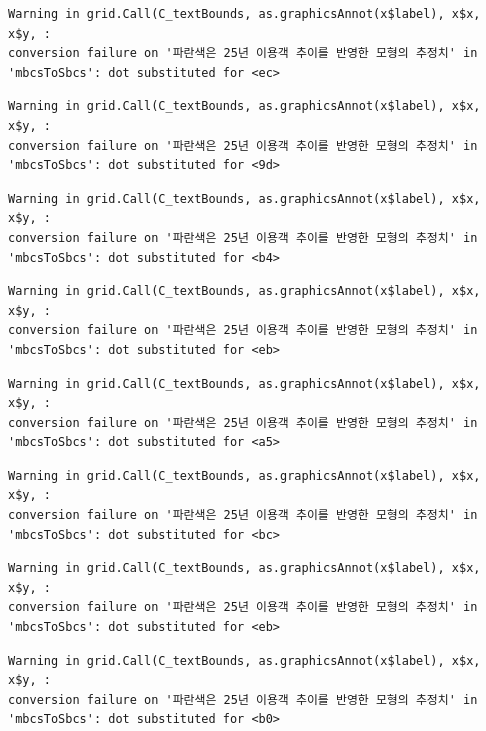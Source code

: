 \documentclass[
  letterpaper,
  DIV=11,
  numbers=noendperiod]{scrreprt}
\begin{document}
\begin{verbatim}
Warning in grid.Call(C_textBounds, as.graphicsAnnot(x$label), x$x, x$y, :
conversion failure on '파란색은 25년 이용객 추이를 반영한 모형의 추정치' in
'mbcsToSbcs': dot substituted for <ec>
\end{verbatim}

\begin{verbatim}
Warning in grid.Call(C_textBounds, as.graphicsAnnot(x$label), x$x, x$y, :
conversion failure on '파란색은 25년 이용객 추이를 반영한 모형의 추정치' in
'mbcsToSbcs': dot substituted for <9d>
\end{verbatim}

\begin{verbatim}
Warning in grid.Call(C_textBounds, as.graphicsAnnot(x$label), x$x, x$y, :
conversion failure on '파란색은 25년 이용객 추이를 반영한 모형의 추정치' in
'mbcsToSbcs': dot substituted for <b4>
\end{verbatim}

\begin{verbatim}
Warning in grid.Call(C_textBounds, as.graphicsAnnot(x$label), x$x, x$y, :
conversion failure on '파란색은 25년 이용객 추이를 반영한 모형의 추정치' in
'mbcsToSbcs': dot substituted for <eb>
\end{verbatim}

\begin{verbatim}
Warning in grid.Call(C_textBounds, as.graphicsAnnot(x$label), x$x, x$y, :
conversion failure on '파란색은 25년 이용객 추이를 반영한 모형의 추정치' in
'mbcsToSbcs': dot substituted for <a5>
\end{verbatim}

\begin{verbatim}
Warning in grid.Call(C_textBounds, as.graphicsAnnot(x$label), x$x, x$y, :
conversion failure on '파란색은 25년 이용객 추이를 반영한 모형의 추정치' in
'mbcsToSbcs': dot substituted for <bc>
\end{verbatim}

\begin{verbatim}
Warning in grid.Call(C_textBounds, as.graphicsAnnot(x$label), x$x, x$y, :
conversion failure on '파란색은 25년 이용객 추이를 반영한 모형의 추정치' in
'mbcsToSbcs': dot substituted for <eb>
\end{verbatim}

\begin{verbatim}
Warning in grid.Call(C_textBounds, as.graphicsAnnot(x$label), x$x, x$y, :
conversion failure on '파란색은 25년 이용객 추이를 반영한 모형의 추정치' in
'mbcsToSbcs': dot substituted for <b0>
\end{verbatim}
\end{document}

